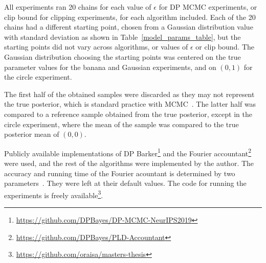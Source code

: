 \documentclass[english,twoside,openright]{HYgraduMLDS}
\begin{document}
All experiments ran 20 chains for each value
of \(\epsilon\) for DP MCMC experiments, or clip bound for clipping experiments,
for each algorithm included. Each of the
20 chains had a different starting point, chosen from a Gaussian
distribution value with standard deviation as
shown in Table~\ref{model_params_table}, but the starting points did
not vary across algorithms, or values of \(\epsilon\) or clip bound.
The Gaussian distribution choosing the starting points was
centered on the true parameter values for the banana and Gaussian experiments,
and on \((0, 1)\) for the circle experiment.

The first half of the obtained samples were discarded as they may not represent
the true posterior, which is standard practice with MCMC~\cite{BDA}. The
latter half was compared to a reference sample obtained from the true posterior,
except in the circle experiment, where the mean of the sample was compared to
the true posterior mean of \((0,0)\).

Publicly available implementations of DP
Barker\footnote{\url{https://github.com/DPBayes/DP-MCMC-NeurIPS2019}}
and the Fourier
accountant\footnote{\url{https://github.com/DPBayes/PLD-Accountant}} were
used, and the rest of the algorithms were implemented by the author.
The accuracy and running time of the Fourier acountant is
determined by two parameters~\cite{KJH20}. They were left at their default values.
The code for running the experiments is freely
available\footnote{\url{https://github.com/oraisa/masters-thesis}}.
\end{document}
